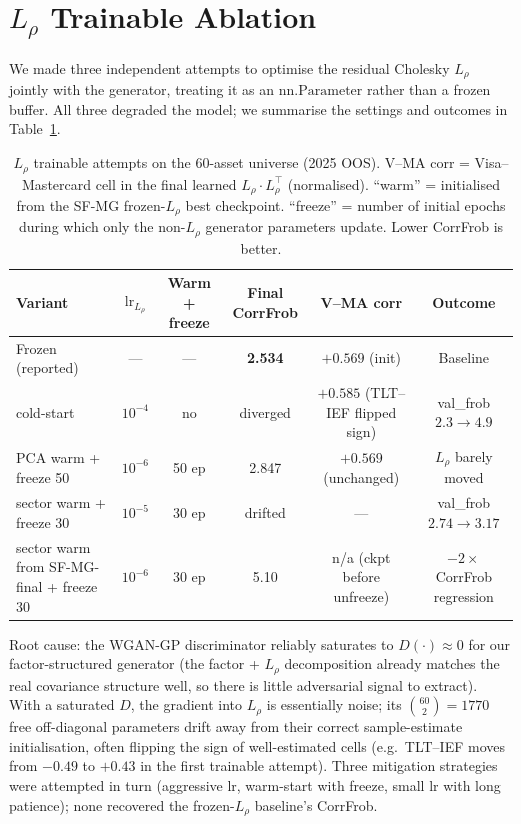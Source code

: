 \section{$L_\rho$ Trainable Ablation}
\label{app:L_rho_ablation}

We made three independent attempts to optimise the residual Cholesky $L_\rho$ jointly with the generator, treating it as an $\mathrm{nn.Parameter}$ rather than a frozen buffer. All three degraded the model; we summarise the settings and outcomes in Table~\ref{tab:L_rho_ablation}.

\begin{table}[h]
\centering
\caption{$L_\rho$ trainable attempts on the 60-asset universe (2025 OOS). V--MA corr = Visa--Mastercard cell in the final learned $L_\rho \cdot L_\rho^\top$ (normalised). ``warm'' = initialised from the SF-MG frozen-$L_\rho$ best checkpoint. ``freeze'' = number of initial epochs during which only the non-$L_\rho$ generator parameters update. Lower CorrFrob is better.}
\label{tab:L_rho_ablation}
\small
\begin{tabular}{lccccc}
\toprule
Variant & $\text{lr}_{L_\rho}$ & Warm + freeze & Final CorrFrob & V--MA corr & Outcome \\
\midrule
Frozen (reported) & --- & --- & \textbf{2.534} & $+0.569$ (init) & Baseline \\
cold-start & $10^{-4}$ & no & diverged & $+0.585$ (TLT--IEF flipped sign) & val\_frob $2.3 \to 4.9$ \\
PCA warm + freeze 50 & $10^{-6}$ & 50 ep & 2.847 & $+0.569$ (unchanged) & $L_\rho$ barely moved \\
sector warm + freeze 30 & $10^{-5}$ & 30 ep & drifted & --- & val\_frob $2.74 \to 3.17$ \\
sector warm from SF-MG-final + freeze 30 & $10^{-6}$ & 30 ep & 5.10 & n/a (ckpt before unfreeze) & $-2 \times$ CorrFrob regression \\
\bottomrule
\end{tabular}
\end{table}

Root cause: the WGAN-GP discriminator reliably saturates to $D(\cdot) \approx 0$ for our factor-structured generator (the factor + $L_\rho$ decomposition already matches the real covariance structure well, so there is little adversarial signal to extract). With a saturated $D$, the gradient into $L_\rho$ is essentially noise; its $\binom{60}{2}=1770$ free off-diagonal parameters drift away from their correct sample-estimate initialisation, often flipping the sign of well-estimated cells (e.g.\ TLT--IEF moves from $-0.49$ to $+0.43$ in the first trainable attempt). Three mitigation strategies were attempted in turn (aggressive lr, warm-start with freeze, small lr with long patience); none recovered the frozen-$L_\rho$ baseline's CorrFrob.

